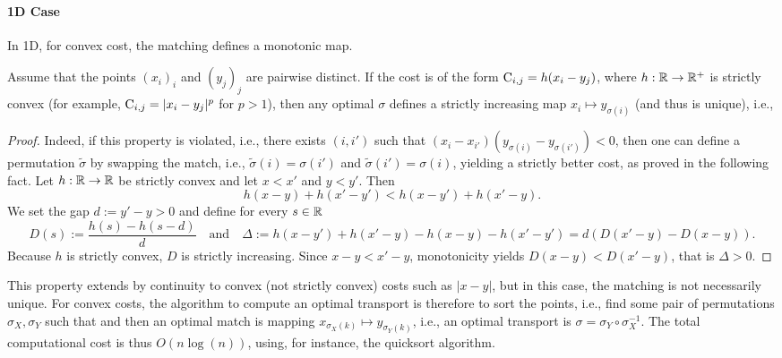 \paragraph{1D Case}

In 1D, for convex cost, the matching defines a monotonic map.

\begin{proposition}\label{prop-matching-1d-monotone}
Assume that the points $(x_i)_i$ and $(y_j)_j$ are pairwise distinct. If the cost is of the form $\mathrm{C}_{i,j}=h(x_i-y_j)$, where $h: \mathbb{R} \rightarrow \mathbb{R}^+$ is strictly convex (for example, $\mathrm{C}_{i,j}=|x_i-y_j|^p$ for $p > 1$), then any optimal $\sigma$ defines a strictly increasing map $x_i \mapsto y_{\sigma(i)}$ (and thus is unique), i.e.,
\end{proposition}
\begin{proof}
Indeed, if this property is violated, i.e., there exists $(i,i')$ such that $(x_i-x_{i'})(y_{\sigma(i)}-y_{\sigma(i')}) < 0$, then one can define a permutation $\tilde{\sigma}$ by swapping the match, i.e., $\tilde{\sigma}(i)=\sigma(i')$ and $\tilde{\sigma}(i')=\sigma(i)$, yielding a strictly better cost, as proved in the following fact.
%
Let $h:\mathbb{R}\to\mathbb{R}$ be strictly convex and let $x < x'$ and $y < y'$. Then
\[
  h(x-y)+h(x'-y') < h(x-y')+h(x'-y).
\]
We set the gap $d:=y'-y > 0$ and define for every $s\in\mathbb{R}$
\[
	  D(s):=\frac{h(s)-h(s-d)}{d}
	\quad\text{and}\quad
	\Delta:=h(x-y')+h(x'-y)-h(x-y)-h(x'-y') = d ( D(x'-y)-D(x-y) ).
\]
Because $h$ is strictly convex, $D$ is strictly increasing.
Since $x-y < x'-y$, monotonicity yields $D(x-y) < D(x'-y)$, that is $\Delta > 0$.
\end{proof}

This property extends by continuity to convex (not strictly convex) costs such as $|x-y|$, but in this case, the matching is not necessarily unique.
For convex costs, the algorithm to compute an optimal transport is therefore to sort the points, i.e., find some pair of permutations $\sigma_X, \sigma_Y$ such that
and then an optimal match is mapping $x_{\sigma_X(k)} \mapsto y_{\sigma_Y(k)}$, i.e., an optimal transport is $\sigma = \sigma_Y \circ \sigma_X^{-1}$. The total computational cost is thus $O(n\log(n))$, using, for instance, the quicksort algorithm.

